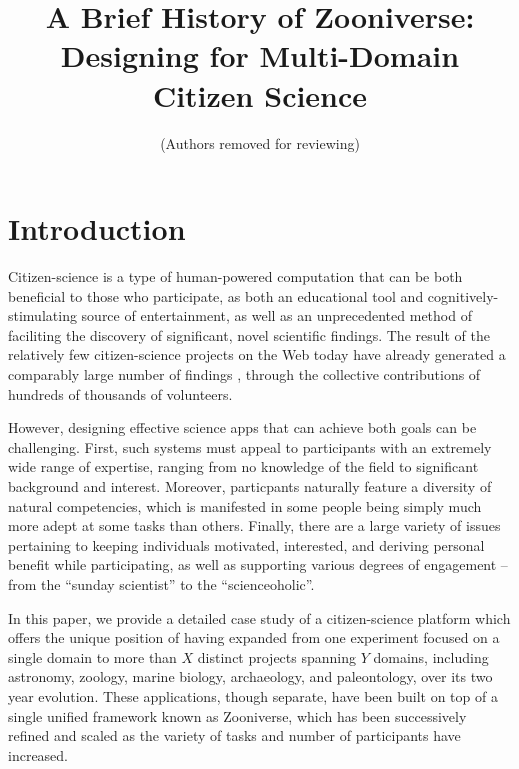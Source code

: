 \documentclass{sigchi}
\begin{document}
\title{A Brief History of Zooniverse: Designing for Multi-Domain Citizen Science}

 \author{ (Authors removed for reviewing) }
\maketitle

\begin{abstract}

\end{abstract}




\section{Introduction}

Citizen-science is a type of human-powered computation \cite{} that
can be both beneficial to those who participate, as both an
educational tool and cognitively-stimulating source of entertainment,
as well as an unprecedented method of faciliting the discovery of
significant, novel scientific findings. The result of the relatively
few citizen-science projects on the Web today have already generated a
comparably large number of findings \cite{}, through the collective
contributions of hundreds of thousands of volunteers.

However, designing effective science apps that can achieve both goals
can be challenging.  First, such systems must appeal to participants
with an extremely wide range of expertise, ranging from no knowledge
of the field to significant background and interest.  Moreover,
particpants naturally feature a diversity of natural competencies,
which is manifested in some people being simply much more adept at
some tasks than others. Finally, there are a large variety of issues
pertaining to keeping individuals motivated, interested, and deriving
personal benefit while participating, as well as supporting various
degrees of engagement -- from the ``sunday scientist'' to the
``scienceoholic''.

In this paper, we provide a detailed case study of a citizen-science
platform which offers the unique position of having expanded from one
experiment focused on a single domain to more than $X$ distinct
projects spanning $Y$ domains, including astronomy, zoology, marine
biology, archaeology, and paleontology, over its two year evolution.
These applications, though separate, have been built on top of a
single unified framework known as Zooniverse, which has been
successively refined and scaled as the variety of tasks and number of
participants have increased.
\end{document}
